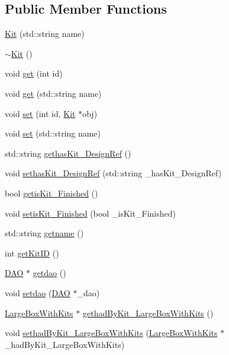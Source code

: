 \subsection*{Public Member Functions}
\begin{DoxyCompactItemize}
\item 
\hyperlink{class_kit_a1a8f0f864ae9b2ce4ff93116220d63a0}{Kit} (std::string name)
\item 
\hyperlink{class_kit_a9cd0bc4ee73f3af65fd763f9e7cc54ec}{$\sim$Kit} ()
\item 
void \hyperlink{class_kit_a1eb42d248a1e535acae0a5f39c01ad98}{get} (int id)
\item 
void \hyperlink{class_kit_a0aac0cbf2762b9592a123a8b7beae7c2}{get} (std::string name)
\item 
void \hyperlink{class_kit_a8e69f7efb0b45640fae0c7a32c0cd8c5}{set} (int id, \hyperlink{class_kit}{Kit} $\ast$obj)
\item 
void \hyperlink{class_kit_a33340ed364478c54149ad10d112791a4}{set} (std::string name)
\item 
std::string \hyperlink{class_kit_afaa9e3276835d2e4740f958ed107f3cc}{gethasKit\_\-DesignRef} ()
\item 
void \hyperlink{class_kit_a1ac23a967c84d44727d0bdc0abc1a77c}{sethasKit\_\-DesignRef} (std::string \_\-hasKit\_\-DesignRef)
\item 
bool \hyperlink{class_kit_a3cbd52540404570d4eb6e1226e542e50}{getisKit\_\-Finished} ()
\item 
void \hyperlink{class_kit_a7f55497fd608ab7de0503aefbca19444}{setisKit\_\-Finished} (bool \_\-isKit\_\-Finished)
\item 
std::string \hyperlink{class_kit_a484f7ee32f1dd698b513078ae9cb3cd9}{getname} ()
\item 
int \hyperlink{class_kit_a7bab458f4a36e90e79b88bdf2409cf23}{getKitID} ()
\item 
\hyperlink{class_d_a_o}{DAO} $\ast$ \hyperlink{class_kit_a256efc500fee99dfa14fb008d5becaa6}{getdao} ()
\item 
void \hyperlink{class_kit_a4414f5779c17cfb2912df2777c210ab5}{setdao} (\hyperlink{class_d_a_o}{DAO} $\ast$\_\-dao)
\item 
\hyperlink{class_large_box_with_kits}{LargeBoxWithKits} $\ast$ \hyperlink{class_kit_ad3996a8c86ae531aa4117f42dc9bd3d2}{gethadByKit\_\-LargeBoxWithKits} ()
\item 
void \hyperlink{class_kit_a3dde8d96ab4ad01589697ed3fdcae0ad}{sethadByKit\_\-LargeBoxWithKits} (\hyperlink{class_large_box_with_kits}{LargeBoxWithKits} $\ast$\_\-hadByKit\_\-LargeBoxWithKits)

\end{DoxyCompactItemize}
